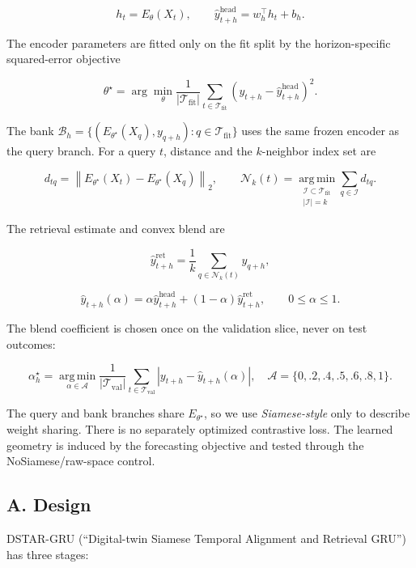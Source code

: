 \documentclass[
  10pt,
  a4paper,
]{article}
\begin{document}
\[
h_t=E_\theta(X_t), \qquad \hat y^{\mathrm{head}}_{t+h}=w_h^\top h_t+b_h .
\]

The encoder parameters are fitted only on the fit split by the
horizon-specific squared-error objective

\[
\theta^\star=\arg\min_\theta \frac{1}{|\mathcal T_{\mathrm{fit}}|}\sum_{t\in\mathcal T_{\mathrm{fit}}}\left(y_{t+h}-\hat y^{\mathrm{head}}_{t+h}\right)^2 .
\]

The bank
\(\mathcal B_h=\{(E_{\theta^\star}(X_q),y_{q+h}):q\in\mathcal T_{\mathrm{fit}}\}\)
uses the same frozen encoder as the query branch. For a query \(t\),
distance and the \(k\)-neighbor index set are

\[
d_{tq}=\left\|E_{\theta^\star}(X_t)-E_{\theta^\star}(X_q)\right\|_2,\qquad
\mathcal N_k(t)=\operatorname*{arg\,min}_{\substack{\mathcal I\subset\mathcal T_{\mathrm{fit}}\\|\mathcal I|=k}}\sum_{q\in\mathcal I}d_{tq}.
\]

The retrieval estimate and convex blend are

\[
\hat y^{\mathrm{ret}}_{t+h}=\frac{1}{k}\sum_{q\in\mathcal N_k(t)}y_{q+h},
\]

\[
\hat y_{t+h}(\alpha)=\alpha\hat y^{\mathrm{head}}_{t+h}+(1-\alpha)\hat y^{\mathrm{ret}}_{t+h},\qquad 0\leq\alpha\leq1.
\]

The blend coefficient is chosen once on the validation slice, never on
test outcomes:

\[
\alpha_h^\star=\operatorname*{arg\,min}_{\alpha\in\mathcal A}
\frac{1}{|\mathcal T_{\mathrm{val}}|}\sum_{t\in\mathcal T_{\mathrm{val}}}
\left|y_{t+h}-\hat y_{t+h}(\alpha)\right|,
\quad \mathcal A=\{0,.2,.4,.5,.6,.8,1\}.
\]

The query and bank branches share \(E_{\theta^\star}\), so we use
\emph{Siamese-style} only to describe weight sharing. There is no
separately optimized contrastive loss. The learned geometry is induced
by the forecasting objective and tested through the NoSiamese/raw-space
control.

\subsection{A. Design}\label{a.-design}

DSTAR-GRU (``Digital-twin Siamese Temporal Alignment and Retrieval
GRU'') has three stages:
\end{document}
